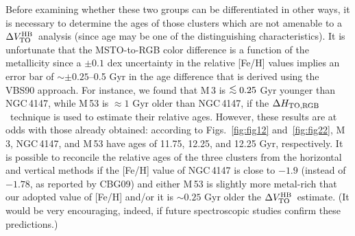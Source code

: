 \documentclass[12pt,preprint]{aastex}
\newcommand\delv{\Delta V^{\rm HB}_{\rm TO}}
\newcommand\delc{\Delta H_{\rm TO,RGB}}
\newcommand\lta{\mathrel{\hbox{\raise 0.6 ex \hbox{$<$}\kern
                   -1.8 ex\lower .5 ex\hbox{$\sim$}}}}
\begin{document}

Before examining whether these two groups can be differentiated in other ways,
it is necessary to determine the ages of those clusters which are not amenable
to a $\delv$\ analysis (since age may be one of the distinguishing
characteristics).  It is unfortunate that the MSTO-to-RGB color difference is
a function of the metallicity since a $\pm 0.1$ dex uncertainty in the relative
[Fe/H] values implies an error bar of $\sim \pm 0.25$--0.5 Gyr in the age
difference that is derived using the VBS90 approach.  For instance, we found
that M$\,$3 is $\lta 0.25$ Gyr younger than NGC$\,$4147, while M$\,$53 is
$\approx 1$ Gyr older than NGC$\,$4147, if the $\delc$\ technique is used to
estimate their relative ages.  However, these results are at odds with those
already obtained: according to Figs.~\ref{fig:fig12} and~\ref{fig:fig22},
M$\,$3, NGC$\,$4147, and M$\,$53 have ages of 11.75, 12.25, and 12.25 Gyr,
respectively.  It is possible to reconcile the relative ages of the three
clusters from the horizontal and vertical methods if the [Fe/H] value of
NGC$\,$4147 is close to $-1.9$ (instead of $-1.78$, as reported by CBG09) and
either M$\,$53 is slightly more metal-rich that our adopted value of [Fe/H]
and/or it is $\sim 0.25$ Gyr older the $\delv$\ estimate.  (It would be very
encouraging, indeed, if future spectroscopic studies confirm these predictions.)
\end{document}
